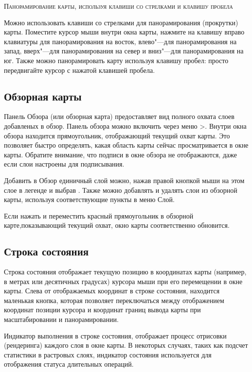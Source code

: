 \begin{Tip}\caption{\textsc{Панорамирование карты, используя клавиши со стрелками и клавишу
пробела}}
Можно использовать клавиши со стрелками для панорамирования (прокрутки) карты. Поместите курсор мыши внутри окна карты, нажмите на клавишу вправо клавиатуры для панорамирования на восток, влево"---для панорамирования на запад, вверх"---для панорамирования на север и вниз"---для панорамирования на юг.
Также можно панорамировать карту используя клавишу пробел: просто передвигайте курсор с нажатой клавишей пробела.
\end{Tip}

\subsection{Обзорная карты}\label{label_mapoverview}

Панель Обзора (или обзорная карта) предоставляет вид полного охвата слоев добавленых в обзор. Панель обзора можно включить через меню  >. Внутри окна обзора находится прямоугольник, отображающий текущий охват карты. Это позволяет быстро определять, какая область карты сейчас просматривается в окне карты. Обратите внимание, что подписи в окне обзора не отображаются, даже если слои настроены для подписывания.

Добавить в Обзор единичный слой можно, нажав правой кнопкой мыши на этом слое в легенде и выбрав . Также можно добавлять и удалять слои из обзорной карты, используя соответствующие пункты в меню Слой.

Если нажать и переместить красный прямоугольник в обзорной карте,показывающий текущий охват, окно карты соответственно обновится.

\subsection{Строка состояния}\label{label_statusbar}

Строка состояния отображает текущую позицию в координатах карты (например, в метрах или десятичных градусах) курсора мыши при его перемещении в окне карты. Слева от отображаемых координат в строке состояния, находится маленькая кнопка, которая позволяет переключаться между отображением координат позиции курсора и координат границ вывода карты при масштабировании и панорамировании.

Индикатор выполнения в строке состояния, отображает процесс отрисовки (рендеринга) каждого слоя в окне карты. В некоторых случаях, таких как подсчет статистики в растровых слоях, индикатор состояния используется для отображения статуса длительных операций.

